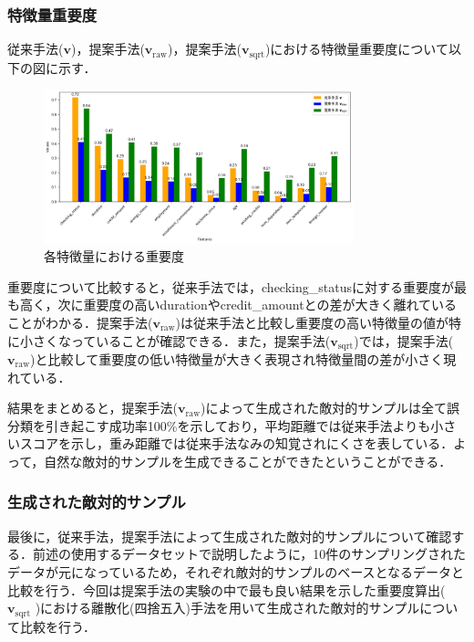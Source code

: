 \subsubsection{特徴量重要度}
従来手法($\bm{v}$)，提案手法($\bm{v}_{\mathrm{raw}}$)，提案手法($\bm{v}_{\mathrm{sqrt}}$)における特徴量重要度について以下の図に示す．
\begin{figure}[H]
    \centering
    \includegraphics[width=0.8\textwidth]{images/実験_重要度算出の結果.png}
    \caption{各特徴量における重要度}
    \label{fig:adversarial_example}
\end{figure}
重要度について比較すると，従来手法では，checking\_statusに対する重要度が最も高く，次に重要度の高いdurationやcredit\_amountとの差が大きく離れていることがわかる．提案手法($\bm{v}_{\mathrm{raw}}$)は従来手法と比較し重要度の高い特徴量の値が特に小さくなっていることが確認できる．また，提案手法($\bm{v}_{\mathrm{sqrt}}$)では，提案手法($\bm{v}_{\mathrm{raw}}$)と比較して重要度の低い特徴量が大きく表現され特徴量間の差が小さく現れている．

結果をまとめると，提案手法($\bm{v}_{\mathrm{raw}}$)によって生成された敵対的サンプルは全て誤分類を引き起こす成功率100\%を示しており，平均距離では従来手法よりも小さいスコアを示し，重み距離では従来手法なみの知覚されにくさを表している．よって，自然な敵対的サンプルを生成できることができたということができる．

\subsubsection{生成された敵対的サンプル}
最後に，従来手法，提案手法によって生成された敵対的サンプルについて確認する．前述の使用するデータセットで説明したように，10件のサンプリングされたデータが元になっているため，それぞれ敵対的サンプルのベースとなるデータと比較を行う．今回は提案手法の実験の中で最も良い結果を示した重要度算出( $\bm{v}_{\mathrm{sqrt}}$ )における離散化(四捨五入)手法を用いて生成された敵対的サンプルについて比較を行う．


